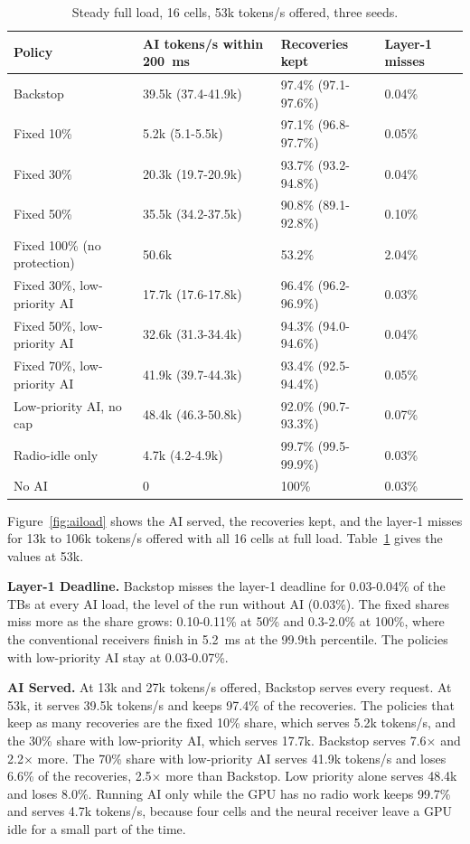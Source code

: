 \documentclass[acmsmall,screen,review,anonymous]{acmart}
\newcommand{\sys}{Backstop\xspace}
\begin{document}
\begin{table}[t]
\caption{Steady full load, 16 cells, 53k tokens/s offered, three seeds.}
\label{tab:steady}
\footnotesize
\begin{tabular}{@{}llll@{}}
\toprule
Policy & AI tokens/s within 200~ms & Recoveries kept & Layer-1 misses \\
\midrule
\sys & 39.5k (37.4-41.9k) & 97.4\% (97.1-97.6\%) & 0.04\% \\
Fixed 10\% & 5.2k (5.1-5.5k) & 97.1\% (96.8-97.7\%) & 0.05\% \\
Fixed 30\% & 20.3k (19.7-20.9k) & 93.7\% (93.2-94.8\%) & 0.04\% \\
Fixed 50\% & 35.5k (34.2-37.5k) & 90.8\% (89.1-92.8\%) & 0.10\% \\
Fixed 100\% (no protection) & 50.6k & 53.2\% & 2.04\% \\
Fixed 30\%, low-priority AI & 17.7k (17.6-17.8k) & 96.4\% (96.2-96.9\%) & 0.03\% \\
Fixed 50\%, low-priority AI & 32.6k (31.3-34.4k) & 94.3\% (94.0-94.6\%) & 0.04\% \\
Fixed 70\%, low-priority AI & 41.9k (39.7-44.3k) & 93.4\% (92.5-94.4\%) & 0.05\% \\
Low-priority AI, no cap & 48.4k (46.3-50.8k) & 92.0\% (90.7-93.3\%) & 0.07\% \\
Radio-idle only & 4.7k (4.2-4.9k) & 99.7\% (99.5-99.9\%) & 0.03\% \\
No AI & 0 & 100\% & 0.03\% \\
\bottomrule
\end{tabular}
\end{table}

Figure~\ref{fig:aiload} shows the AI served, the recoveries kept, and the layer-1 misses for 13k to 106k
tokens/s offered with all 16 cells at full load. Table~\ref{tab:steady} gives the values at 53k.

\noindent\textbf{Layer-1 Deadline.} \sys misses the layer-1 deadline for 0.03-0.04\% of the TBs at every AI
load, the level of the run without AI (0.03\%). The fixed shares miss more as the share grows: 0.10-0.11\%
at 50\% and 0.3-2.0\% at 100\%, where the conventional receivers finish in 5.2~ms at the 99.9th percentile.
The policies with low-priority AI stay at 0.03-0.07\%.

\noindent\textbf{AI Served.} At 13k and 27k tokens/s offered, \sys serves every request. At 53k, it serves
39.5k tokens/s and keeps 97.4\% of the recoveries. The policies that keep as many recoveries are the fixed
10\% share, which serves 5.2k tokens/s, and the 30\% share with low-priority AI, which serves 17.7k. \sys
serves 7.6$\times$ and 2.2$\times$ more. The 70\% share with low-priority AI serves 41.9k tokens/s and loses
6.6\% of the recoveries, 2.5$\times$ more than \sys. Low priority alone serves 48.4k and loses 8.0\%.
Running AI only while the GPU has no radio work keeps 99.7\% and serves 4.7k tokens/s, because four cells
and the neural receiver leave a GPU idle for a small part of the time.
\end{document}
